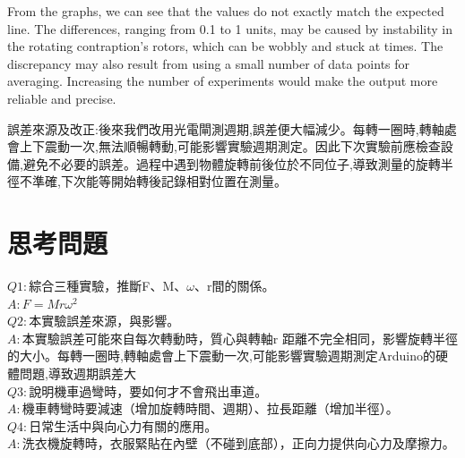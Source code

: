 \documentclass[12pt]{article}
\begin{document}
From the graphs, we can see that the values do not exactly match the expected line. The differences, ranging from 0.1 to 1 units, may be caused by instability in the rotating contraption's rotors, which can be wobbly and stuck at times. The discrepancy may also result from using a small number of data points for averaging. Increasing the number of experiments would make the output more reliable and precise.

誤差來源及改正:後來我們改用光電閘測週期,誤差便大幅減少。每轉一圈時,轉軸處會上下震動一次,無法順暢轉動,可能影響實驗週期測定。因此下次實驗前應檢查設備,避免不必要的誤差。過程中遇到物體旋轉前後位於不同位子,導致測量的旋轉半徑不準確,下次能等開始轉後記錄相對位置在測量。
\section*{\textbf{思考問題}}
\large
\noindent
$Q1:$綜合三種實驗，推斷F、M、$\omega$、r間的關係。\\
$A:$$F=Mr\omega^2$\\

\noindent
$Q2:$本實驗誤差來源，與影響。\\
$A:$本實驗誤差可能來自每次轉動時，質心與轉軸r 距離不完全相同，影響旋轉半徑的大小。每轉一圈時,轉軸處會上下震動一次,可能影響實驗週期測定Arduino的硬體問題,導致週期誤差大\\ 

\noindent
$Q3:$說明機車過彎時，要如何才不會飛出車道。\\
$A:$機車轉彎時要減速（增加旋轉時間、週期）、拉長距離（增加半徑）。\\

\noindent
$Q4:$日常生活中與向心力有關的應用。\\
$A:$洗衣機旋轉時，衣服緊貼在內壁（不碰到底部），正向力提供向心力及摩擦力。
\end{document}
